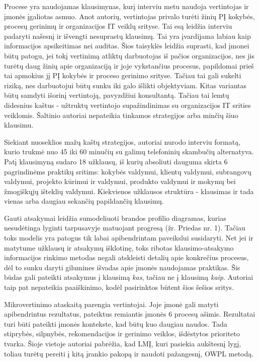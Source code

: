 \documentclass{VUMIFPSkursinis}
\begin{document}
Procese yra naudojamas klausimynas, kurį interviu metu naudoja vertintojas ir įmonės įgaliotas asmuo. Anot autorių, vertintojas privalo turėti žinių PĮ kokybės, procesų gerinimų ir organizacijos IT veiklų srityse. Tai esą leidžia interviu padaryti našesnį ir išvengti nesuprastų klausimų. Tai yra įvardijama labiau kaip informacijos apsikeitimas nei auditas. Šios taisyklės leidžia suprasti, kad įmonei būtų patogu, jei tokį vertinimą atliktų darbuotojas iš pačios organizacijos, nes jis turėtų daug žinių apie organizaciją ir joje vykstančius procesus, papildomai prieš tai apmokius jį PĮ kokybės ir proceso gerinimo srityse. Tačiau tai gali sukelti riziką, nes darbuotojui būtų sunku iki galo išlikti objektyviam. Kitas variantas būtų samdyti išorinį vertintoją, pavyzdžiui konsultantą. Tačiau tai lemtų didesnius kaštus - užtruktų vertintojo supažindinimas su organizacijos IT srities veiklomis. Šaltinio autoriai nepateikia tinkamos strategijos arba minčių šiuo klausimu.

Siekiant nuoseklios mažų kaštų strategijos, autoriai nurodo interviu formatą, kurio trukmė nuo 45 iki 60 minučių su galimų telefoninių skambučių alternatyva. Patį klausimyną sudaro 18 užklausų, iš kurių absoliuti dauguma skirta 6 pagrindinėms praktikų sritims: kokybės valdymui, klientų valdymui, subrangovų valdymui, projekto kūrimui ir valdymui, produkto valdymui ir mokymų bei žmogiškųjų išteklių valdymui. Kiekvienos užklausos struktūra - klausimas ir tada vienas arba daugiau sekančių papildančių klausimų. 

Gauti atsakymai leidžia sumodeliuoti brandos profilio diagramas, kurias nesudėtinga lyginti tarpusavyje matuojant progresą (žr. Priedas nr. 1). Tačiau toks modelis yra patogus tik labai apibendrintam paveikslui susidaryti. Net jei ir matytume užklausų ir atsakymų išklotinę, toks ribotas klausimo-atsakymo informacijos rinkimo metodas negali atskleisti detalių apie konkrečius procesus, dėl to sunku daryti gilumines išvadas apie įmonės naudojamas praktikas. Šis būdas gali pateikti atsakymus į klausimą \textit{kas}, tačiau ne į klausimą \textit{kaip}. Autoriai taip pat nepateikia paaiškinimo, kodėl pasirinktos būtent šios šešios sritys.

Mikrovertinimo ataskaitą parengia vertintojai. Joje įmonė gali matyti apibendrintus rezultatus, pateiktus remiantis įmonės 6 procesų ašimis. Rezultatai turi būti pateikti įmonės kontekste, kad būtų kuo daugiau naudos. Tada stiprybės, silpnybės, rekomendacijos ir gerinimo veiklos, išdėstytos prioriteto tvarka. Šioje vietoje autoriai pabrėžia, kad LMĮ, kuri pasiekia aukštesnį lygį, toliau turėtų pereiti į kitą įrankio pakopą ir naudoti pažangesnį, OWPL metodą.
\end{document}
